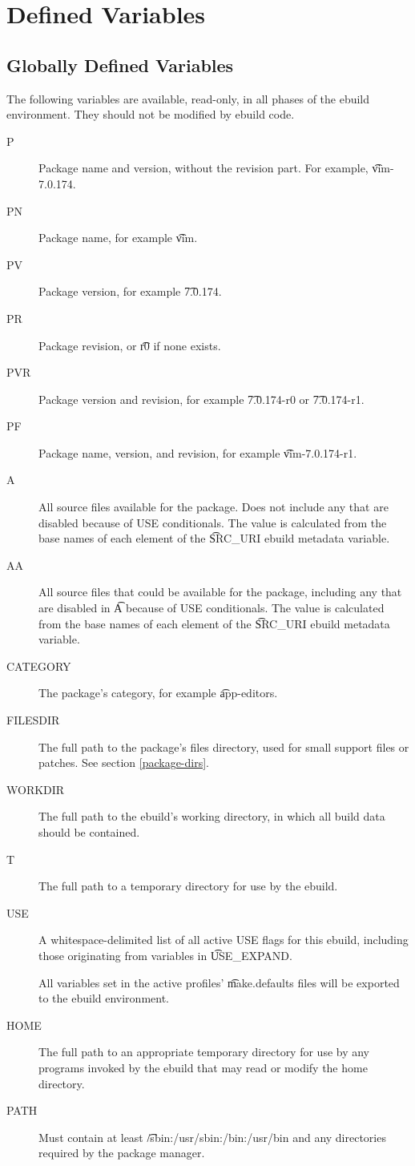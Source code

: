 \section{Defined Variables}
\label{ebuild-env-vars}

\subsection{Globally Defined Variables}
\label{global-ebuild-vars}

The following variables are available, read-only, in all phases of the ebuild environment. They
should not be modified by ebuild code.
\begin{description}
\item[P] Package name and version, without the revision part. For example, \t{vim-7.0.174}.
\item[PN] Package name, for example \t{vim}.
\item[PV] Package version, for example \t{7.0.174}.
\item[PR] Package revision, or \t{r0} if none exists.
\item[PVR] Package version and revision, for example \t{7.0.174-r0} or \t{7.0.174-r1}.
\item[PF] Package name, version, and revision, for example \t{vim-7.0.174-r1}.
\item[A] All source files available for the package. Does not include any that are disabled because
    of USE conditionals. The value is calculated from the base names of each element of the
    \t{SRC\_URI} ebuild metadata variable.
\item[AA] All source files that could be available for the package, including any that are disabled
    in \t{A} because of USE conditionals. The value is calculated from the base names of each element
    of the \t{SRC\_URI} ebuild metadata variable.
\item[CATEGORY] The package's category, for example \t{app-editors}.
\item[FILESDIR] The full path to the package's files directory, used for small support files or
    patches. See section \ref{package-dirs}.
\item[WORKDIR] The full path to the ebuild's working directory, in which all build data should be
    contained. \label{env-var-WORKDIR}
\item[T] The full path to a temporary directory for use by the ebuild.
\item[USE] A whitespace-delimited list of all active USE flags for this ebuild, including those
    originating from variables in \t{USE\_EXPAND}.
\item[] All variables set in the active profiles' \t{make.defaults} files will be exported to the
    ebuild environment.
\item[HOME] The full path to an appropriate temporary directory for use by any programs invoked by
    the ebuild that may read or modify the home directory.
\item[PATH] Must contain at least \t{/sbin:/usr/sbin:/bin:/usr/bin} and any directories required
    by the package manager.
\end{description}

